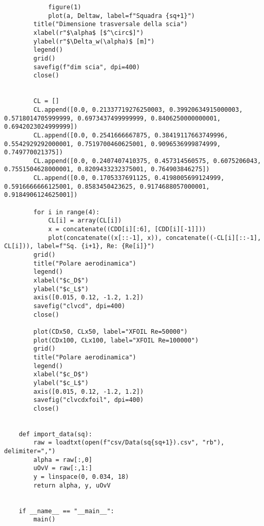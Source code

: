 \begin{lstlisting}
            figure(1)
            plot(a, Deltaw, label=f"Squadra {sq+1}")
        title("Dimensione trasversale della scia")
        xlabel(r"$\alpha$ [$^\circ$]")
        ylabel(r"$\Delta_w(\alpha)$ [m]")
        legend()
        grid()
        savefig(f"dim scia", dpi=400)
        close()
    
    
        CL = []
        CL.append([0.0, 0.21337719276250003, 0.39920634915000003, 0.5718014705999999, 0.6973437499999999, 0.8406250000000001, 0.6942023024999999])
        CL.append([0.0, 0.2541666667875, 0.38419117663749996, 0.5542929292000001, 0.7519700460625001, 0.9096536999874999, 0.749770021375])
        CL.append([0.0, 0.2407407410375, 0.457314560575, 0.6075206043, 0.7551504628000001, 0.8209433232375001, 0.764903846275])
        CL.append([0.0, 0.1705337691125, 0.4198005699124999, 0.5916666666125001, 0.8583450423625, 0.9174688057000001, 0.9184906124625001])
    
        for i in range(4):
            CL[i] = array(CL[i])
            x = concatenate((CDD[i][:6], [CDD[i][-1]]))
            plot(concatenate((x[::-1], x)), concatenate((-CL[i][::-1], CL[i])), label=f"Sq. {i+1}, Re: {Re[i]}")
        grid()
        title("Polare aerodinamica")
        legend()
        xlabel("$c_D$")
        ylabel("$c_L$")
        axis([0.015, 0.12, -1.2, 1.2])
        savefig("clvcd", dpi=400)
        close()
    
        plot(CDx50, CLx50, label="XFOIL Re=50000")
        plot(CDx100, CLx100, label="XFOIL Re=100000")
        grid()
        title("Polare aerodinamica")
        legend()
        xlabel("$c_D$")
        ylabel("$c_L$")
        axis([0.015, 0.12, -1.2, 1.2])
        savefig("clvcdxfoil", dpi=400)
        close()
    
    
    def import_data(sq):
        raw = loadtxt(open(f"csv/Data(sq{sq+1}).csv", "rb"), delimiter=",")
        alpha = raw[:,0]
        uOvV = raw[:,1:]
        y = linspace(0, 0.034, 18)
        return alpha, y, uOvV
    
    
    if __name__ == "__main__":
        main()
\end{lstlisting}


